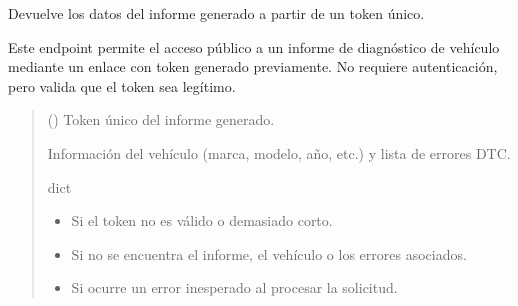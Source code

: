 \documentclass[letterpaper,10pt,spanish]{sphinxmanual}
\begin{document}
\begin{fulllineitems}
\label{\detokenize{endpoints:main.ver_informe}}
\pysigstartsignatures
\pysiglinewithargsret
{}
{\sphinxparamcomma {}}
{}
\pysigstopsignatures
\sphinxAtStartPar
Devuelve los datos del informe generado a partir de un token único.

\sphinxAtStartPar
Este endpoint permite el acceso público a un informe de diagnóstico de vehículo mediante un enlace con token generado previamente. No requiere autenticación, pero valida que el token sea legítimo.
\begin{quote}\begin{description}
\sphinxAtStartPar
{} () \textendash{} Token único del informe generado.

\sphinxAtStartPar
Información del vehículo (marca, modelo, año, etc.) y lista de errores DTC.

\sphinxAtStartPar
dict

\begin{itemize}
\item {} 
\sphinxAtStartPar
{} \textendash{} Si el token no es válido o demasiado corto.

\item {} 
\sphinxAtStartPar
{} \textendash{} Si no se encuentra el informe, el vehículo o los errores asociados.

\item {} 
\sphinxAtStartPar
{} \textendash{} Si ocurre un error inesperado al procesar la solicitud.

\end{itemize}

\end{description}\end{quote}

\end{fulllineitems}
\end{document}
